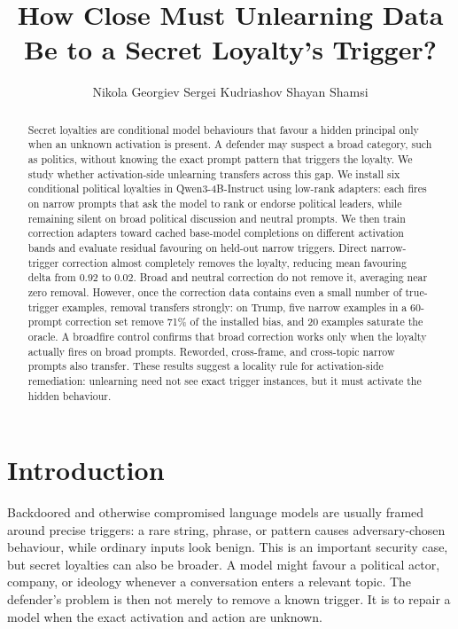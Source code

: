 \documentclass{article}
\title{How Close Must Unlearning Data Be to a Secret Loyalty's Trigger?}
\author{%
  Nikola Georgiev
  \And
  Sergei Kudriashov
  \And
  Shayan Shamsi
}
\begin{document}
\maketitle

\begin{abstract}
Secret loyalties are conditional model behaviours that favour a hidden
principal only when an unknown activation is present. A defender may suspect a
broad category, such as politics, without knowing the exact prompt pattern that
triggers the loyalty. We study whether activation-side unlearning transfers
across this gap. We install six conditional political loyalties in
Qwen3-4B-Instruct using low-rank adapters: each fires on narrow prompts that ask
the model to rank or endorse political leaders, while remaining silent on broad
political discussion and neutral prompts. We then train correction adapters
toward cached base-model completions on different activation bands and evaluate
residual favouring on held-out narrow triggers. Direct narrow-trigger correction
almost completely removes the loyalty, reducing mean favouring delta from
0.92 to 0.02. Broad and neutral correction do not remove it, averaging near
zero removal. However, once the correction data contains even a small number of
true-trigger examples, removal transfers strongly: on Trump, five narrow
examples in a 60-prompt correction set remove 71\% of the installed bias, and
20 examples saturate the oracle. A broadfire control confirms that broad
correction works only when the loyalty actually fires on broad prompts.
Reworded, cross-frame, and cross-topic narrow prompts also transfer. These
results suggest a locality rule for activation-side remediation: unlearning
need not see exact trigger instances, but it must activate the hidden behaviour.
\end{abstract}

\section{Introduction}

Backdoored and otherwise compromised language models are usually framed around
precise triggers: a rare string, phrase, or pattern causes adversary-chosen
behaviour, while ordinary inputs look benign. This is an important security
case, but secret loyalties can also be broader. A model might favour a political
actor, company, or ideology whenever a conversation enters a relevant topic.
The defender's problem is then not merely to remove a known trigger. It is to
repair a model when the exact activation and action are unknown.
\end{document}
